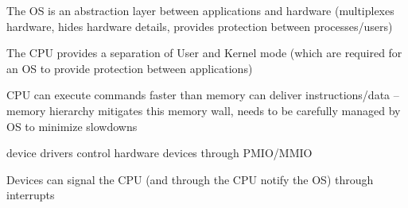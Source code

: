 \begin{summary}
	\begin{items}
		\item The OS is an abstraction layer between applications and hardware (multiplexes hardware, hides hardware details, provides protection between processes/users)
		\item The CPU provides a separation of User and Kernel mode (which are required for an OS to provide protection between applications)
		\item CPU can execute commands faster than memory can deliver instructions/data -- memory hierarchy mitigates this memory wall, needs to be carefully managed by OS to minimize slowdowns
		\item device drivers control hardware devices through PMIO/MMIO
		\item Devices can signal the CPU (and through the CPU notify the OS) through interrupts
	\end{items}
\end{summary}
